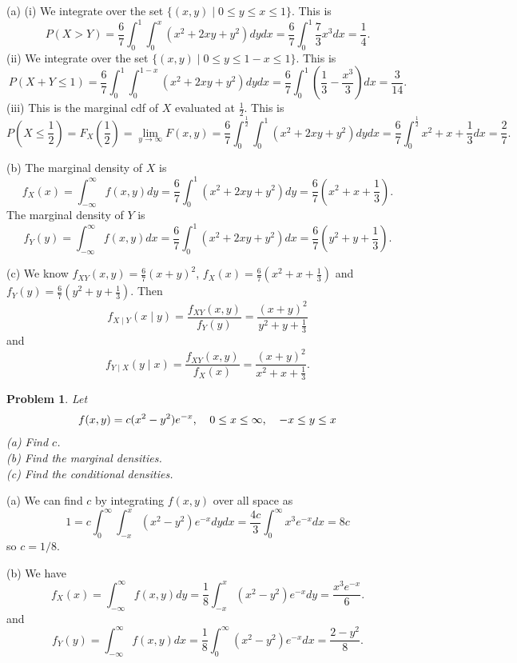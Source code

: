 \documentclass{article}
\newtheorem{problem}{Problem}
\begin{document}
(a) (i) We integrate over the set $\{(x,y) \mid 0 \leq y \leq x \leq 1\}$. This is
\[
P(X > Y) = \frac{6}{7} \int_0^1 \int_0^x (x^2 + 2xy + y^2) dy dx = \frac{6}{7} \int_0^1 \frac{7}{3}x^3 dx = \frac{1}{4}.
\]
(ii) We integrate over the set $\{(x,y) \mid 0 \leq y \leq 1 - x \leq 1\}$. This is
\[
P(X + Y \leq 1) = \frac{6}{7} \int_0^1 \int_0^{1-x} (x^2 + 2xy + y^2) dy dx = \frac{6}{7} \int_0^1 \left ( \frac{1}{3} - \frac{x^3}{3} \right ) dx = \frac{3}{14}.
\]
(iii) This is the marginal cdf of $X$ evaluated at $\frac{1}{2}$. This is
\[
P \left ( X \leq \frac{1}{2} \right ) = F_X \left ( \frac{1}{2} \right ) = \lim_{y \rightarrow \infty} F(x,y) = \frac{6}{7} \int_0^{\frac{1}{2}} \int_0^1 (x^2 + 2xy + y^2) dy dx = \frac{6}{7} \int_0^{\frac{1}{2}} x^2 + x + \frac{1}{3} dx = \frac{2}{7}.
\]

(b) The marginal density of $X$ is
\[
f_X(x) = \int_{-\infty}^{\infty} f(x,y) dy = \frac{6}{7} \int_0^1 (x^2 + 2xy + y^2) dy = \frac{6}{7} \left ( x^2 + x + \frac{1}{3} \right ).
\]
The marginal density of $Y$ is
\[
f_Y(y) = \int_{-\infty}^{\infty} f(x,y) dx = \frac{6}{7} \int_0^1 (x^2 + 2xy + y^2) dx = \frac{6}{7} \left ( y^2 + y + \frac{1}{3} \right ).
\]

(c) We know $f_{XY}(x,y) = \frac{6}{7} (x+y)^2$, $f_X(x) = \frac{6}{7} \left ( x^2 + x + \frac{1}{3} \right )$ and $f_Y(y) = \frac{6}{7} \left ( y^2 + y + \frac{1}{3} \right )$. Then
\[
f_{X \mid Y}(x \mid y) = \frac{f_{XY}(x,y)}{f_Y(y)} = \frac{(x+y)^2}{y^2 + y + \frac{1}{3}}
\]
and
\[
f_{Y \mid X}(y \mid x) = \frac{f_{XY}(x,y)}{f_X(x)} = \frac{(x+y)^2}{x^2 + x + \frac{1}{3}}.
\]

\begin{problem}
Let
\[
\begin{tabular}{ccc}
$\displaystyle{f(x,y) = c(x^2-y^2)e^{-x}}$, & $\displaystyle{0 \leq x \leq \infty}$, & $\displaystyle{-x \leq y \leq x}$
\end{tabular}
\]
(a) Find $c$.\\
(b) Find the marginal densities.\\
(c) Find the conditional densities.
\end{problem}

(a) We can find $c$ by integrating $f(x,y)$ over all space as
\[
1 = c \int_0^{\infty} \int_{-x}^x (x^2 - y^2) e^{-x} dy dx = \frac{4c}{3} \int_0^{\infty} x^3 e^{-x} dx = 8c
\]
so $c = 1/8$.

(b) We have
\[
f_X(x) = \int_{-\infty}^{\infty} f(x,y) dy = \frac{1}{8} \int_{-x}^x (x^2 - y^2)e^{-x}dy = \frac{x^3e^{-x}}{6}.
\]
and
\[
f_Y(y) = \int_{-\infty}^{\infty} f(x,y) dx = \frac{1}{8} \int_0^{\infty} (x^2 - y^2)e^{-x}dx = \frac{2-y^2}{8}.
\]
\end{document}
